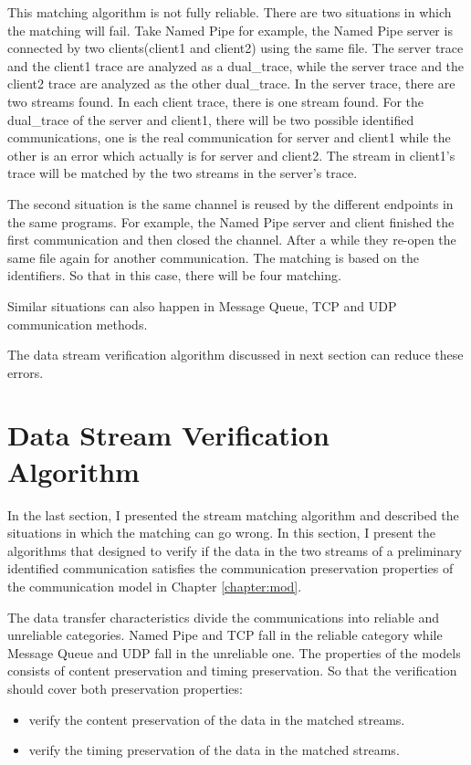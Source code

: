 This matching algorithm is not fully reliable. There are two situations in which the matching will fail. Take Named Pipe for example, the Named Pipe server is connected by two clients(client1 and client2) using the same file. The server trace and the client1 trace are analyzed as a dual\_trace, while the server trace and the client2 trace are analyzed as the other dual\_trace. In the server trace, there are two streams found. In each client trace, there is one stream found. For the dual\_trace of the server and client1, there will be two possible identified communications, one is the real communication for server and client1 while the other is an error which actually is for server and client2. The stream in client1's trace will be matched by the two streams in the server's trace. 

The second situation is the same channel is reused by the different endpoints in the same programs. For example, the Named Pipe server and client finished the first communication and then closed the channel. After a while they re-open the same file again for another communication. The matching is based on the identifiers. So that in this case, there will be four matching.

Similar situations can also happen in Message Queue, TCP and UDP communication methods. 

The data stream verification algorithm discussed in next section can reduce these errors. 

\section{Data Stream Verification Algorithm}\label{verfication}
In the last section, I presented the stream matching algorithm and described the situations in which the matching can go wrong. In this section, I present the algorithms that designed to verify if the data in the two streams of a preliminary identified communication satisfies the communication preservation properties of the communication model in Chapter \ref{chapter:mod}. 

The data transfer characteristics divide the communications into reliable and unreliable categories. Named Pipe and TCP fall in the reliable category while Message Queue and UDP fall in the unreliable one. The properties of the models consists of content preservation and timing preservation. So that the verification should cover both preservation properties: 
\begin{itemize}
\item verify the content preservation of the data in the matched streams. 
\item verify the timing preservation of the data in the matched streams. 
\end{itemize}

